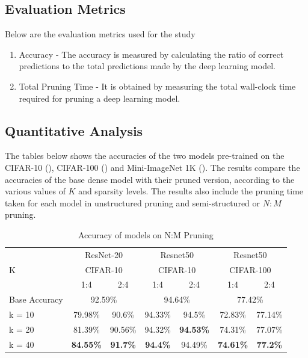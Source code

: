 \documentclass[11pt]{extreport}
\begin{document}
		\subsection[Evaluation Metrics]{Evaluation Metrics}
		Below are the evaluation metrics used for the study
		\begin{enumerate}
			\item Accuracy - The accuracy is measured by calculating the ratio of correct predictions to the total predictions made by the deep learning model.
			\item Total Pruning Time - It is obtained by measuring the total wall-clock time required for pruning a deep learning model.
		\end{enumerate}
		\newpage
		\subsection[Quantitative Analysis]{Quantitative Analysis}
			The tables below shows the accuracies of the two models pre-trained on the CIFAR-10 (\cite{cifar}), CIFAR-100 (\cite{cifar}) and Mini-ImageNet 1K (\cite{data_01}). The results compare the accuracies of the base dense model with their pruned version, according to the various values of $K$ and sparsity levels. The results also include the pruning time taken for each model in unstructured pruning and semi-structured or \(N:M\) pruning.
			\begin{table}[H]
				\centering
				\caption{Accuracy of models on N:M Pruning}
				\begin{tabular}{lcccccc} 
					\toprule
					\multirow{3}{*}{K} & \multicolumn{2}{c}{ResNet-20} & \multicolumn{2}{c}{Resnet50} & \multicolumn{2}{c}{Resnet50}   \\
									& \multicolumn{2}{c}{CIFAR-10} & \multicolumn{2}{c}{CIFAR-10} & \multicolumn{2}{c}{CIFAR-100}  \\ 
					\cmidrule{2-7}
									& 1:4     & 2:4                & 1:4    & 2:4                 & 1:4     & 2:4                  \\ 
					\hline
					Base Accuracy      & \multicolumn{2}{c}{92.59\%}  & \multicolumn{2}{c}{94.64\%}  & \multicolumn{2}{c}{77.42\%}    \\ 
					\midrule
					k = 10             & 79.98\% & 90.6\%                    & 94.33\%& 94.5\%                       & 72.83\% & 77.14\%\\
					k = 20             & 81.39\% & 90.56\%                   & 94.32\%& \textbf{94.53\%}             & 74.31\% & 77.07\%\\
					k = 40             & \textbf{84.55\%} & \textbf{91.7\%}  & \textbf{94.4\%} & 94.49\%             & \textbf{74.61\%} & \textbf{77.2\%}               \\
					\bottomrule 
				\end{tabular}
				\label{table1}
			\end{table}
\end{document}
